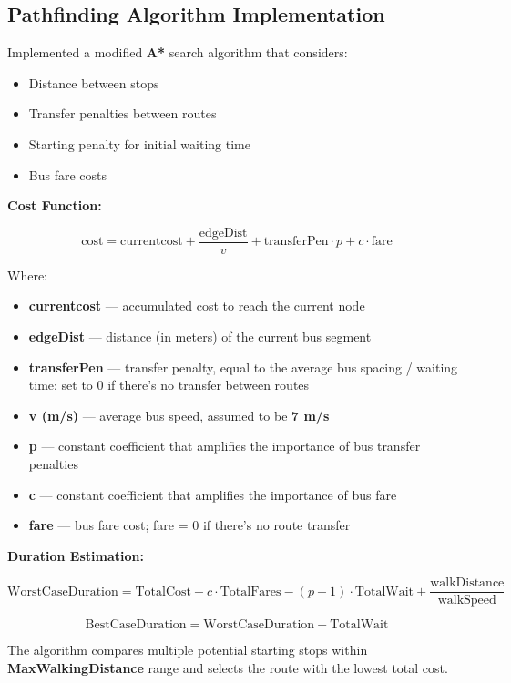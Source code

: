 \subsection{Pathfinding Algorithm Implementation}

Implemented a modified \textbf{A*} search algorithm that considers:
\begin{itemize}
    \item Distance between stops
    \item Transfer penalties between routes
    \item Starting penalty for initial waiting time
    \item Bus fare costs
\end{itemize}

\textbf{Cost Function:}

$$\text{cost} = \text{currentcost} + \frac{\text{edgeDist}}{v} + \text{transferPen} \cdot p + c \cdot \text{fare}$$

Where:
\begin{itemize}
    \item \textbf{currentcost} — accumulated cost to reach the current node
    \item \textbf{edgeDist} — distance (in meters) of the current bus segment
    \item \textbf{transferPen} — transfer penalty, equal to the average bus spacing / waiting time; set to 0 if there's no transfer between routes
    \item \textbf{v (m/s)} — average bus speed, assumed to be \textbf{7 m/s}
    \item \textbf{p} — constant coefficient that amplifies the importance of bus transfer penalties
    \item \textbf{c} — constant coefficient that amplifies the importance of bus fare
    \item \textbf{fare} — bus fare cost; fare = 0 if there's no route transfer
\end{itemize}

\textbf{Duration Estimation:}

$$\text{WorstCaseDuration} = \text{TotalCost} - c \cdot \text{TotalFares} - (p-1) \cdot \text{TotalWait} + \frac{\text{walkDistance}}{\text{walkSpeed}}$$

$$\text{BestCaseDuration} = \text{WorstCaseDuration} - \text{TotalWait}$$

The algorithm compares multiple potential starting stops within \textbf{MaxWalkingDistance} range and selects the route with the lowest total cost.

